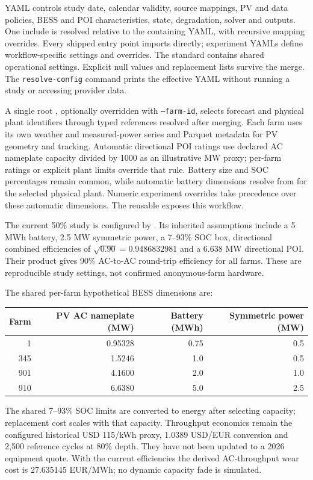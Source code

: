 \documentclass[11pt,a4paper]{article}
\begin{document}
YAML controls study date, calendar validity, source mappings, PV and data policies,
BESS and POI characteristics, state, degradation, solver and outputs. One include
is resolved relative to the containing YAML, with recursive mapping overrides.
Every shipped entry point imports  directly;
experiment YAMLs define workflow-specific settings and overrides. The standard
contains shared operational settings. Explicit null values and replacement
lists survive the merge. The \texttt{resolve-config} command prints the effective
YAML without running a study or accessing provider data.

A single root , optionally overridden with \texttt{--farm-id},
selects forecast and physical plant identifiers through typed references resolved
after merging. Each farm uses its own weather and measured-power series and
Parquet metadata for PV geometry and tracking. Automatic directional POI ratings
use declared AC nameplate capacity divided by 1000 as an illustrative MW proxy;
per-farm ratings or explicit plant limits override that rule. Battery size and
SOC percentages remain common, while automatic battery dimensions resolve from
 for the selected physical plant. Numeric experiment
overrides take precedence over these automatic dimensions. The reusable
 exposes this workflow.

The current 50\% study is configured by
.
Its inherited assumptions include a 5 MWh battery, 2.5 MW symmetric power,
a 7--93\% SOC box, directional combined efficiencies of
$\sqrt{0.90}=0.9486832981$ and a 6.638 MW directional POI. Their product
gives 90\% AC-to-AC round-trip efficiency for all farms.
These are reproducible study settings, not confirmed anonymous-farm hardware.


The shared per-farm hypothetical BESS dimensions are:
\begin{center}
\begin{tabular}{rrrr}
\toprule Farm & PV AC nameplate (MW) & Battery (MWh) & Symmetric power (MW)\\
\midrule
1 & 0.95328 & 0.75 & 0.5\\
345 & 1.5246 & 1.0 & 0.5\\
901 & 4.1600 & 2.0 & 1.0\\
910 & 6.6380 & 5.0 & 2.5\\
\bottomrule
\end{tabular}
\end{center}
The shared 7--93\% SOC limits are converted to energy after selecting capacity;
replacement cost scales with that capacity. Throughput economics remain the
configured historical USD 115/kWh proxy, 1.0389 USD/EUR conversion and 2,500
reference cycles at 80\% depth. They have not been updated to a 2026 equipment
quote. With the current efficiencies the derived AC-throughput wear cost is
27.635145 EUR/MWh; no dynamic capacity fade is simulated.
\end{document}
